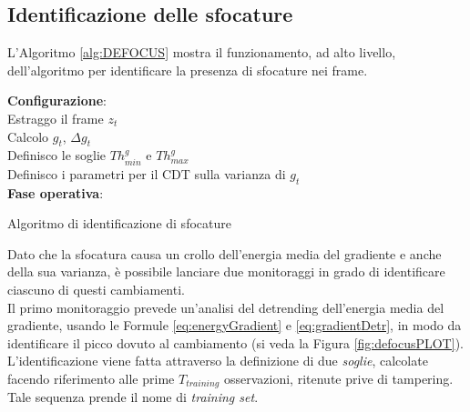 \subsection{Identificazione delle sfocature}
\label{defocusDetection}
L'Algoritmo \ref{alg:DEFOCUS} mostra il funzionamento, ad alto livello, dell'algoritmo per identificare la presenza di sfocature nei frame.
\begin{algorithm}[t]
	\LinesNumbered
	\textbf{Configurazione}:\\
	 
	{	 Estraggo il frame $z_t$ \\
		 Calcolo $g_t$, $\Delta g_t$ \\
	}
	 Definisco le soglie $Th_{min}^g$ e $Th_{max}^g$\\
	 Definisco i parametri per il CDT sulla varianza di $g_t$\\
	\textbf{Fase operativa}:\\
	    
	\caption{Algoritmo di identificazione di sfocature}
	\label{alg:DEFOCUS}
\end{algorithm}
Dato che la sfocatura causa un crollo dell'energia media del gradiente e anche della sua varianza, \`e possibile lanciare due monitoraggi in grado di identificare ciascuno di questi cambiamenti.\\
Il primo monitoraggio prevede un'analisi del detrending dell'energia media del gradiente, usando le Formule \eqref{eq:energyGradient} e \eqref{eq:gradientDetr}, in modo da identificare il picco dovuto al cambiamento (si veda la Figura \ref{fig:defocusPLOT}).
L'identificazione viene fatta attraverso la definizione di due \textit{soglie}, calcolate facendo riferimento alle prime $T_{training}$ osservazioni, ritenute prive di tampering.
Tale sequenza prende il nome di \textit{training set}.
